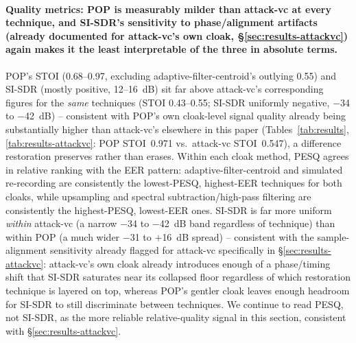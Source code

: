 \documentclass[11pt]{article}
\begin{document}
\paragraph{Quality metrics: POP is measurably milder than attack-vc at
every technique, and SI-SDR's sensitivity to phase/alignment artifacts
(already documented for attack-vc's own cloak, \S\ref{sec:results-attackvc})
again makes it the least interpretable of the three in absolute terms.}
POP's STOI (0.68--0.97, excluding adaptive-filter-centroid's outlying
0.55) and SI-SDR (mostly positive, 12--16~dB) sit far above attack-vc's
corresponding figures for the \emph{same} techniques (STOI 0.43--0.55;
SI-SDR uniformly negative, $-$34 to $-$42~dB) -- consistent with POP's
own cloak-level signal quality already being substantially higher than
attack-vc's elsewhere in this paper (Tables~\ref{tab:results},
\ref{tab:results-attackvc}: POP STOI~0.971 vs.\ attack-vc STOI~0.547),
a difference restoration preserves rather than erases. Within each
cloak method, PESQ agrees in relative ranking with the EER pattern:
adaptive-filter-centroid and simulated re-recording are consistently
the lowest-PESQ, highest-EER techniques for both cloaks, while
upsampling and spectral subtraction/high-pass filtering are
consistently the highest-PESQ, lowest-EER ones. SI-SDR is far more
uniform \emph{within} attack-vc (a narrow $-$34 to $-$42~dB band
regardless of technique) than within POP (a much wider $-$31 to
$+$16~dB spread) -- consistent with the sample-alignment sensitivity
already flagged for attack-vc specifically in \S\ref{sec:results-attackvc}:
attack-vc's own cloak already introduces enough of a phase/timing shift
that SI-SDR saturates near its collapsed floor regardless of which
restoration technique is layered on top, whereas POP's gentler cloak
leaves enough headroom for SI-SDR to still discriminate between
techniques. We continue to read PESQ, not SI-SDR, as the more reliable
relative-quality signal in this section, consistent with
\S\ref{sec:results-attackvc}.
\end{document}
